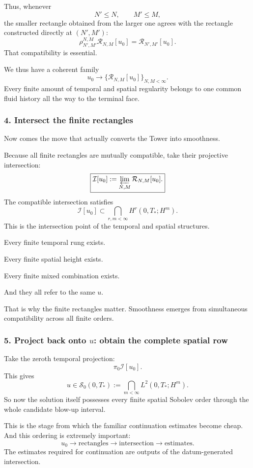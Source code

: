 \documentclass[11pt]{article}
\theoremstyle{definition}
\theoremstyle{remark}
\begin{document}
Thus, whenever
\[
N'\le N,
\qquad
M'\le M,
\]
the smaller rectangle obtained from the larger one agrees with the rectangle
constructed directly at \((N',M')\):
\[
\rho_{N',M'}^{N,M}
\mathcal R_{N,M}[u_0]
=
\mathcal R_{N',M'}[u_0].
\]
That compatibility is essential.

We thus have a coherent family
\[
\boxed{
u_0
\longrightarrow
\{\mathcal R_{N,M}[u_0]\}_{N,M<\infty}.
}
\]
Every finite amount of temporal and spatial regularity belongs to one common
fluid history all the way to the terminal face.

\subsubsection*{4. Intersect the finite rectangles}

Now comes the move that actually converts the Tower into smoothness.

Because all finite rectangles are mutually compatible, take their projective
intersection:
\[
\boxed{
\mathcal I[u_0]
:=
\varprojlim_{N,M}
\mathcal R_{N,M}[u_0].
}
\]
The compatible intersection satisfies
\[
\mathcal I[u_0]
\subset
\bigcap_{r,m<\infty}
H^r(0,T_*;H^m).
\]
This is the intersection point of the temporal and spatial structures.

Every finite temporal rung exists.

Every finite spatial height exists.

Every finite mixed combination exists.

And they all refer to the same \(u\).

That is why the finite rectangles matter.  Smoothness emerges from simultaneous
compatibility across all finite orders.

\subsubsection*{5. Project back onto \(u\): obtain the complete spatial row}

Take the zeroth temporal projection:
\[
\pi_0\mathcal I[u_0].
\]
This gives
\[
\boxed{
u\in
\mathscr S_0(0,T_*)
:=
\bigcap_{m<\infty}
L^2(0,T_*;H^m).
}
\]
So now the solution itself possesses every finite spatial Sobolev order through the
whole candidate blow-up interval.

This is the stage from which the familiar continuation estimates become
cheap.  And this ordering is extremely important:
\[
\boxed{
u_0
\longrightarrow
\text{rectangles}
\longrightarrow
\text{intersection}
\longrightarrow
\text{estimates}.
}
\]
The estimates required for continuation are outputs of the datum-generated
intersection.
\end{document}
